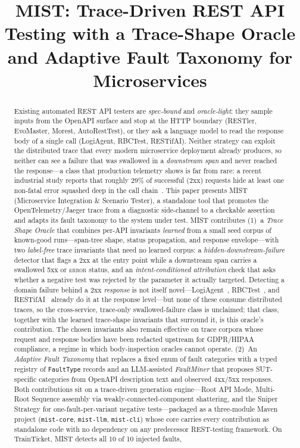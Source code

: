 \documentclass[conference]{IEEEtran}
\title{MIST: Trace-Driven REST API Testing with a Trace-Shape Oracle and Adaptive Fault Taxonomy for Microservices}
\author{\IEEEauthorblockN{Tingshuo Miao}\IEEEauthorblockA{Department of Computer Science\\Baylor University, USA\\Email: tingshuo\_miao2@baylor.edu}}
\begin{document}
\maketitle

\begin{abstract}
Existing automated REST API testers are \emph{spec-bound} and \emph{oracle-light}: they sample inputs from the OpenAPI surface and stop at the HTTP boundary (RESTler, EvoMaster, Morest, AutoRestTest), or they ask a language model to read the response body of a single call (LogiAgent, RBCTest, RESTifAI). Neither strategy can exploit the distributed trace that every modern microservice deployment already produces, so neither can see a failure that was swallowed in a \emph{downstream span} and never reached the response---a class that production telemetry shows is far from rare: a recent industrial study reports that roughly 29\% of successful (2xx) requests hide at least one non-fatal error squashed deep in the call chain~\cite{uber2025tale}. This paper presents \textsc{MIST} (Microservice Integration \& Scenario Tester), a standalone tool that promotes the OpenTelemetry/Jaeger trace from a diagnostic side-channel to a checkable assertion and adapts its fault taxonomy to the system under test. \textsc{MIST} contributes (1)~a \emph{Trace Shape Oracle} that combines per-API invariants \emph{learned} from a small seed corpus of known-good runs---span-tree shape, status propagation, and response envelope---with two \emph{label-free} trace invariants that need no learned corpus: a \emph{hidden-downstream-failure} detector that flags a 2xx at the entry point while a downstream span carries a swallowed 5xx or \textsc{error} status, and an \emph{intent-conditioned attribution} check that asks whether a negative test was rejected by the parameter it actually targeted. Detecting a domain failure behind a 2xx \emph{response} is not itself novel---LogiAgent~\cite{zhang2025logiagent}, RBCTest~\cite{rbctest2026}, and RESTifAI~\cite{restifai2026} already do it at the response level---but none of these consume distributed traces, so the cross-service, trace-only swallowed-failure class is unclaimed; that class, together with the learned trace-shape invariants that surround it, is this oracle's contribution. The chosen invariants also remain effective on trace corpora whose request and response bodies have been redacted upstream for GDPR/HIPAA compliance, a regime in which body-inspection oracles cannot operate. (2)~An \emph{Adaptive Fault Taxonomy} that replaces a fixed enum of fault categories with a typed registry of \texttt{FaultType} records and an LLM-assisted \emph{FaultMiner} that proposes SUT-specific categories from OpenAPI description text and observed 4xx/5xx responses. Both contributions sit on a trace-driven generation engine---Root API Mode, Multi-Root Sequence assembly via weakly-connected-component shattering, and the Sniper Strategy for one-fault-per-variant negative tests---packaged as a three-module Maven project (\texttt{mist-core}, \texttt{mist-llm}, \texttt{mist-cli}) whose core carries every contribution as standalone code with no dependency on any predecessor REST-testing framework. On TrainTicket, \textsc{MIST} detects all 10 of 10 injected faults, 
\end{abstract}
\end{document}
